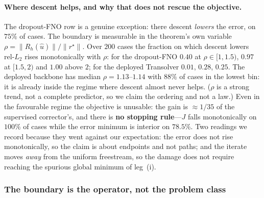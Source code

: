 \paragraph{Where descent helps, and why that does not rescue the objective.} The
dropout-FNO row is a genuine exception: there descent \emph{lowers} the error, on $75\%$
of cases. The boundary is measurable in the theorem's own variable
$\rho=\|R_h(\hat u)\|/\|r^\star\|$. Over $200$ cases the fraction on which descent lowers
$\mathrm{rel}\text{-}L_2$ rises monotonically with $\rho$: for the dropout-FNO $0.40$ at
$\rho\in[1,1.5)$, $0.97$ at $[1.5,2)$ and $1.00$ above $2$; for the deployed Transolver
$0.01$, $0.28$, $0.25$. The deployed backbone has median $\rho=1.13$--$1.14$ with $88\%$
of cases in the lowest bin: it is already inside the regime where descent almost never
helps. ($\rho$ is a strong trend, not a complete predictor, so we claim the ordering and
not a law.) Even in the favourable regime the objective is unusable: the gain is
${\approx}1/35$ of the supervised corrector's, and there is \textbf{no stopping
rule}---$J$ falls monotonically on $100\%$ of cases while the error minimum is interior
on $78.5\%$. Two readings we record because they went against our expectation: the error
does not rise monotonically, so the claim is about endpoints and not paths; and the
iterate moves \emph{away} from the uniform freestream, so the damage does not require
reaching the spurious global minimum of leg~(i).



\subsubsection{The boundary is the operator, not the problem class}
\label{sec:regime}

